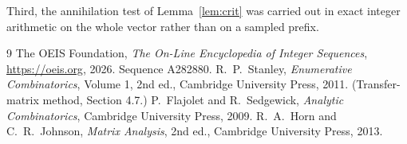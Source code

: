 \documentclass[11pt,a4paper]{article}
\theoremstyle{plain}
\theoremstyle{definition}
\begin{document}
Third, the annihilation test of Lemma~\ref{lem:crit} was carried out in exact integer
arithmetic on the whole vector rather than on a sampled prefix.

\begin{thebibliography}{9}
 The OEIS Foundation, \emph{The On-Line Encyclopedia of Integer
Sequences}, \url{https://oeis.org}, 2026. Sequence A282880.
 R.~P.~Stanley, \emph{Enumerative Combinatorics}, Volume 1, 2nd ed.,
Cambridge University Press, 2011. (Transfer-matrix method, Section 4.7.)
 P.~Flajolet and R.~Sedgewick, \emph{Analytic Combinatorics}, Cambridge
University Press, 2009.
 R.~A.~Horn and C.~R.~Johnson, \emph{Matrix Analysis}, 2nd ed., Cambridge
University Press, 2013.
\end{thebibliography}
\end{document}
